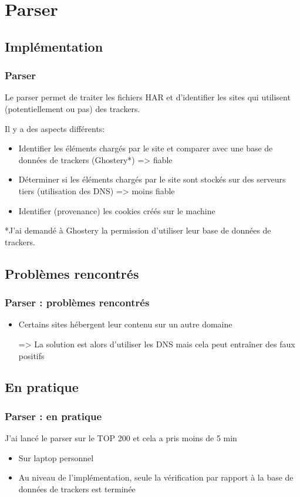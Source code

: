 \documentclass{beamer}
\begin{document}
  \section{Parser}
  \subsection{Implémentation}
  \begin{frame}
  \frametitle{Parser}
  Le parser permet de traiter les fichiers HAR et d'identifier les sites qui utilisent (potentiellement ou pas) des trackers.
  
  Il y a des aspects différents:
  \begin{itemize}
    \item Identifier les éléments chargés par le site et comparer avec une base de données de trackers (Ghostery*) => fiable
    \item Déterminer si les éléments chargés par le site sont stockés sur des serveurs tiers (utilisation des DNS) => moins fiable
    \item Identifier (provenance) les cookies créés sur le machine
    
  \end{itemize}
  
  *J'ai demandé à Ghostery la permission d'utiliser leur base de données de trackers.
  \end{frame}
  
  
  \subsection{Problèmes rencontrés}
  \begin{frame}
  \frametitle{Parser : problèmes rencontrés}
    \begin{itemize}
      \item Certains sites hébergent leur contenu sur un autre domaine
      
      => La solution est alors d'utiliser les DNS mais cela peut entraîner des faux positifs
    \end{itemize}
  \end{frame}
  
  \subsection{En pratique}
  \begin{frame}
  \frametitle{Parser : en pratique}
  J'ai lancé le parser sur le TOP 200 et cela a pris moins de 5 min
    \begin{itemize}
    \item Sur laptop personnel
    \item Au niveau de l'implémentation, seule la vérification par rapport à la base de données de trackers est terminée
    \end{itemize}
  \end{frame}
  
\end{document}
